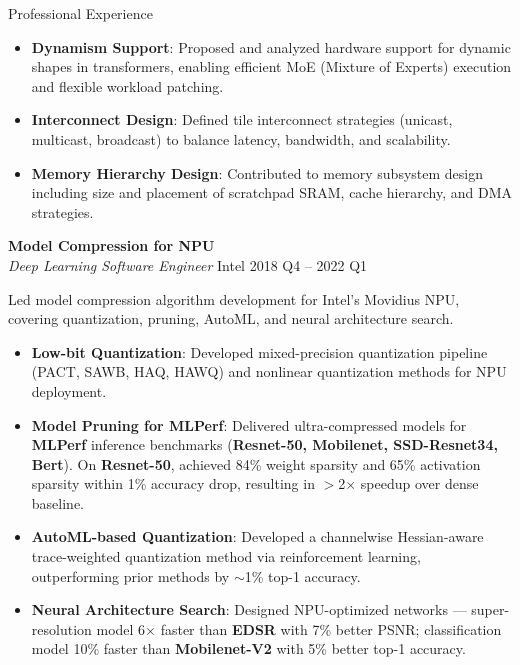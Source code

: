 \documentclass{resume} %
\begin{document}
\begin{rSection}{Professional Experience}
\begin{itemize}
\begin{itemize}
  \item \textbf{Dynamism Support}: 
  Proposed and analyzed hardware support for dynamic shapes in transformers, enabling efficient MoE (Mixture of Experts) execution and flexible workload patching.
  
  \item \textbf{Interconnect Design}: 
  Defined tile interconnect strategies (unicast, multicast, broadcast) to balance latency, bandwidth, and scalability.
  
  \item \textbf{Memory Hierarchy Design}: 
  Contributed to memory subsystem design including size and placement of scratchpad SRAM, cache hierarchy, and DMA strategies.
\end{itemize}

\end{itemize}

\textbf{Model Compression for NPU} \\
\textit{Deep Learning Software Engineer} \hfill Intel \hfill 2018 Q4 -- 2022 Q1

\vspace{4pt}

Led model compression algorithm development for Intel's Movidius NPU, covering quantization, pruning, AutoML, and neural architecture search.

\begin{itemize}
\item \textbf{Low-bit Quantization}: Developed mixed-precision quantization pipeline (PACT, SAWB, HAQ, HAWQ) and nonlinear quantization methods for NPU deployment.

\item \textbf{Model Pruning for MLPerf}: Delivered ultra-compressed models for \textbf{MLPerf} inference benchmarks (\textbf{Resnet-50, Mobilenet, SSD-Resnet34, Bert}). On \textbf{Resnet-50}, achieved 84\% weight sparsity and 65\% activation sparsity within 1\% accuracy drop, resulting in $>$2$\times$ speedup over dense baseline.

\item \textbf{AutoML-based Quantization}: Developed a channelwise Hessian-aware trace-weighted quantization method via reinforcement learning, outperforming prior methods by $\sim$1\% top-1 accuracy.

\item \textbf{Neural Architecture Search}: Designed NPU-optimized networks --- super-resolution model 6$\times$ faster than \textbf{EDSR} with 7\% better PSNR; classification model 10\% faster than \textbf{Mobilenet-V2} with 5\% better top-1 accuracy.
\end{itemize}



\end{rSection}
\end{document}
